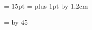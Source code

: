 \begin{\parsearg\beginxxx}
{%
%
\def\|{%
  \leavevmode
  \vadjust{%
    \vskip-\baselineskip
    \llap{%
      \vrule height\baselineskip width1pt
      \hskip 12pt
    }%
  }%
}

%
\def\finalout{\overfullrule=0pt}




\def\openindices{%
   \newindex{cp}%
   \newcodeindex{fn}%
   \newcodeindex{vr}%
   \newcodeindex{tp}%
   \newcodeindex{ky}%
   \newcodeindex{pg}%
}


\newdimen{} {} = 15pt
\parindent = 
\parskip 18pt plus 1pt
\setleading{15pt}
\advance\topskip by 1.2cm



%
\ifx\emergencystretch\thisisundefined
  \def\emergencystretch{}%
\else
  \emergencystretch = \hsize
  \divide\emergencystretch by 45
\fi

}
\end{\parsearg\beginxxx}
